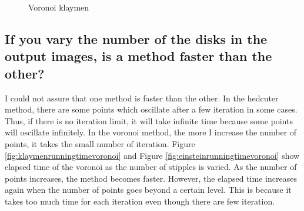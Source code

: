 \documentclass[11pt]{article}
\begin{document}
	\begin{figure}[ht] 
	\begin{center} 
		\hspace{5mm}
		\hspace{5mm}
		\hspace{5mm}
	\caption{Voronoi klaymen} 
	\label{fig:varydiskvoronoi}
	\end{center} 
	\end{figure}
\clearpage

\subsection{If you vary the number of the disks in the output images, is a method faster than the other?}%
I could not assure that one method is faster than the other. In the hedcuter method, there are some points which oscillate after a few iteration in some cases. Thus, if there is no iteration limit, it will take infinite time because some points will oscillate infinitely. In the voronoi method, the more I increase the number of points, it takes the small number of iteration. Figure \ref{fig:klaymenrunningtimevoronoi} and Figure \ref{fig:einsteinrunningtimevoronoi} show elapsed time of the voronoi as the number of stipples is varied. As the number of points increases, the method becomes faster. However, the elapsed time increases again when the number of points goes beyond a certain level. This is because it takes too much time for each iteration even though there are few iteration.
\end{document}
